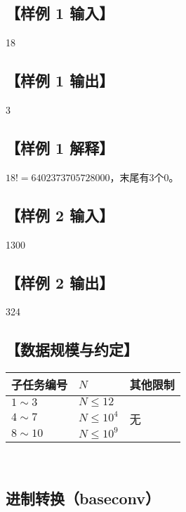 \documentclass[12pt]{article}
\begin{document}
	\subsection*{\normalsize 【样例 1 输入】}
	18
	\subsection*{\normalsize 【样例 1 输出】}
	3
	\subsection*{\normalsize 【样例 1 解释】}
	$18! = 6402373705728000$，末尾有3个0。
	
	\subsection*{\normalsize 【样例 2 输入】}
	1300
	\subsection*{\normalsize 【样例 2 输出】}
	324
	\subsection*{\normalsize 【数据规模与约定】}
	\begin{center}
		\begin{tabular}{|p{}<{\centering}|p{}<{\centering}|p{}<{\centering}|}
		\hline
		子任务编号 & $N$ & 其他限制\\
		\hline
		$1 \sim 3$ & $N \le 12$ & \multirow{3}{*}{无}\\
		\cline{1-2}
		$4 \sim 7$ & $N \le 10^4$ & \\
		\cline{1-2}
		$8 \sim 10$ & $N \le 10^9$ & \\
		\hline
		\end{tabular}\\
	\end{center}

	\newpage
	\begin{center} \section*{\Large 进制转换（baseconv）} \end{center}
	\pagestyle{fancy}
	\fancyhf{}
	
\end{document}
